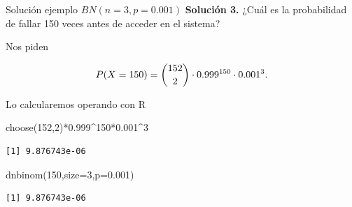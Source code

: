 \documentclass[
  ignorenonframetext,
  aspectratio=169]{beamer}
\newenvironment{Shaded}{\begin{snugshade}}{\end{snugshade}}
\newcommand{\AttributeTok}[1]{\textcolor[rgb]{0.40,0.45,0.13}{#1}}
\newcommand{\DecValTok}[1]{\textcolor[rgb]{0.68,0.00,0.00}{#1}}
\newcommand{\FloatTok}[1]{\textcolor[rgb]{0.68,0.00,0.00}{#1}}
\newcommand{\FunctionTok}[1]{\textcolor[rgb]{0.28,0.35,0.67}{#1}}
\newcommand{\NormalTok}[1]{\textcolor[rgb]{0.00,0.23,0.31}{#1}}
\newcommand{\SpecialCharTok}[1]{\textcolor[rgb]{0.37,0.37,0.37}{#1}}
\begin{document}
\begin{frame}[fragile]{Solución ejemplo \(BN(n=3,p=0.001)\)}
\protect\hypertarget{soluciuxf3n-ejemplo-bnn3p0.001}{}
\textbf{Solución 3.} ¿Cuál es la probabilidad de fallar 150 veces antes
de acceder en el sistema?

Nos piden

\[
\scriptsize{P(X=150)= {152\choose 2} \cdot 0.999^{150}\cdot 0.001^3.}
\]

Lo calcularemos operando con R

\begin{Shaded}
\begin{Highlighting}[]
\FunctionTok{choose}\NormalTok{(}\DecValTok{152}\NormalTok{,}\DecValTok{2}\NormalTok{)}\SpecialCharTok{*}\FloatTok{0.999}\SpecialCharTok{\^{}}\DecValTok{150}\SpecialCharTok{*}\FloatTok{0.001}\SpecialCharTok{\^{}}\DecValTok{3}
\end{Highlighting}
\end{Shaded}

\begin{verbatim}
[1] 9.876743e-06
\end{verbatim}

\begin{Shaded}
\begin{Highlighting}[]
\FunctionTok{dnbinom}\NormalTok{(}\DecValTok{150}\NormalTok{,}\AttributeTok{size=}\DecValTok{3}\NormalTok{,}\AttributeTok{p=}\FloatTok{0.001}\NormalTok{)}
\end{Highlighting}
\end{Shaded}

\begin{verbatim}
[1] 9.876743e-06
\end{verbatim}
\end{frame}
\end{document}
